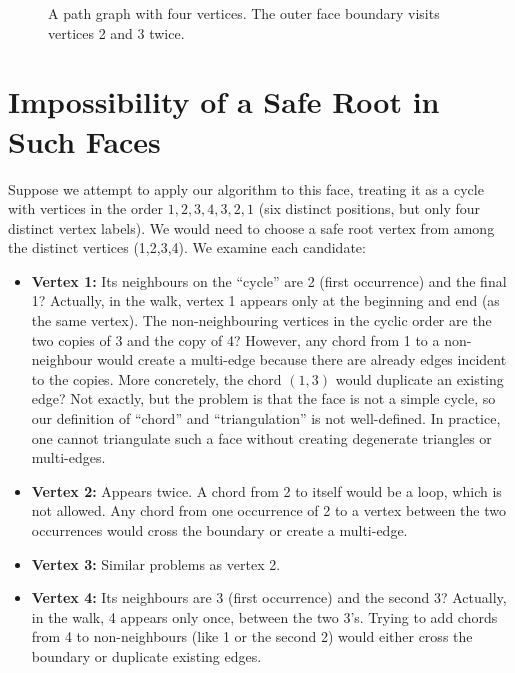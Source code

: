 \begin{figure}[htbp]
    \centering
    \caption{A path graph with four vertices. The outer face boundary visits vertices 2 and 3 twice.}
    \label{fig:path4}
\end{figure}

\section{Impossibility of a Safe Root in Such Faces}
\label{sec:no_safe_root_1connected}

Suppose we attempt to apply our algorithm to this face, treating it as a cycle with vertices in the order \(1,2,3,4,3,2,1\) (six distinct positions, but only four distinct vertex labels). 
We would need to choose a safe root vertex from among the distinct vertices (1,2,3,4). 
We examine each candidate:

\begin{itemize}
    \item \textbf{Vertex 1:} Its neighbours on the “cycle” are 2 (first occurrence) and the final 1? Actually, in the walk, vertex 1 appears only at the beginning and end (as the same vertex). 
    The non-neighbouring vertices in the cyclic order are the two copies of 3 and the copy of 4? However, any chord from 1 to a non-neighbour would create a multi-edge because there are already edges incident to the copies. 
    More concretely, the chord \((1,3)\) would duplicate an existing edge? Not exactly, but the problem is that the face is not a simple cycle, so our definition of “chord” and “triangulation” is not well-defined. 
    In practice, one cannot triangulate such a face without creating degenerate triangles or multi-edges.
    
    \item \textbf{Vertex 2:} Appears twice. 
    A chord from 2 to itself would be a loop, which is not allowed. 
    Any chord from one occurrence of 2 to a vertex between the two occurrences would cross the boundary or create a multi-edge.
    
    \item \textbf{Vertex 3:} Similar problems as vertex 2.
    
    \item \textbf{Vertex 4:} Its neighbours are 3 (first occurrence) and the second 3? Actually, in the walk, 4 appears only once, between the two 3’s. 
    Trying to add chords from 4 to non-neighbours (like 1 or the second 2) would either cross the boundary or duplicate existing edges.
\end{itemize}

